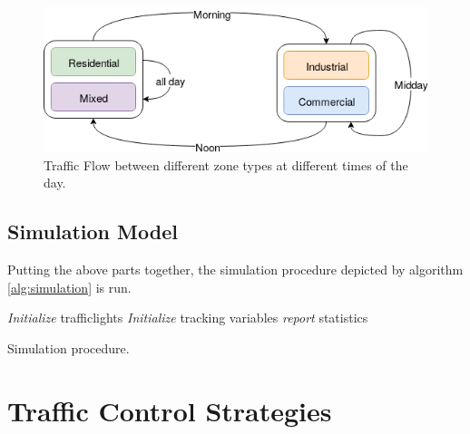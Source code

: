 \documentclass[10pt]{article}
\begin{document}
\begin{figure}
	\includegraphics[width=\linewidth]{img/zoned-traffic-flow.png}
	\caption{Traffic Flow between different zone types at different times of the day. \label{fig:zone-traffic-flow}}
\end{figure}

\subsection{Simulation Model}
Putting the above parts together, the simulation procedure depicted by algorithm \ref{alg:simulation} is run.

\DontPrintSemicolon
{}
\begin{algorithm}[h]
	\;
	\;
	\textit{Initialize} trafficlights\;
	\textit{Initialize} tracking variables\;
	\; 
	\;
	\textit{report} statistics\;	
	
	\caption{Simulation procedure. \label{alg:simulation}}

\end{algorithm}

\section{Traffic Control Strategies}
\end{document}
